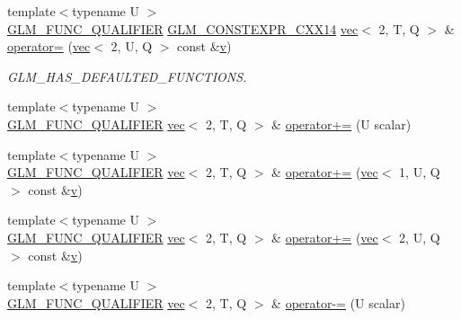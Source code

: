 \begin{DoxyCompactItemize}
\item 
{\footnotesize template$<$typename U $>$ }\\\hyperlink{setup_8hpp_a33fdea6f91c5f834105f7415e2a64407}{G\+L\+M\+\_\+\+F\+U\+N\+C\+\_\+\+Q\+U\+A\+L\+I\+F\+I\+ER} \hyperlink{setup_8hpp_a4dd12abf5e1164bc57f3a34671d03844}{G\+L\+M\+\_\+\+C\+O\+N\+S\+T\+E\+X\+P\+R\+\_\+\+C\+X\+X14} \hyperlink{structglm_1_1vec}{vec}$<$ 2, T, Q $>$ \& \hyperlink{structglm_1_1vec_3_012_00_01_t_00_01_q_01_4_a9bd00e17d1fda738c0e07b652e39e7f6}{operator=} (\hyperlink{structglm_1_1vec}{vec}$<$ 2, U, Q $>$ const \&\hyperlink{_s_d_l__opengl_8h_a10a82eabcb59d2fcd74acee063775f90}{v})
\begin{DoxyCompactList}\small\item\em G\+L\+M\+\_\+\+H\+A\+S\+\_\+\+D\+E\+F\+A\+U\+L\+T\+E\+D\+\_\+\+F\+U\+N\+C\+T\+I\+O\+NS. \end{DoxyCompactList}\item 
{\footnotesize template$<$typename U $>$ }\\\hyperlink{setup_8hpp_a33fdea6f91c5f834105f7415e2a64407}{G\+L\+M\+\_\+\+F\+U\+N\+C\+\_\+\+Q\+U\+A\+L\+I\+F\+I\+ER} \hyperlink{structglm_1_1vec}{vec}$<$ 2, T, Q $>$ \& \hyperlink{structglm_1_1vec_3_012_00_01_t_00_01_q_01_4_a85009f198924c17e5830290e55c04323}{operator+=} (U scalar)
\item 
{\footnotesize template$<$typename U $>$ }\\\hyperlink{setup_8hpp_a33fdea6f91c5f834105f7415e2a64407}{G\+L\+M\+\_\+\+F\+U\+N\+C\+\_\+\+Q\+U\+A\+L\+I\+F\+I\+ER} \hyperlink{structglm_1_1vec}{vec}$<$ 2, T, Q $>$ \& \hyperlink{structglm_1_1vec_3_012_00_01_t_00_01_q_01_4_a5a24f12fc3b14e67842a4759cdca08b2}{operator+=} (\hyperlink{structglm_1_1vec}{vec}$<$ 1, U, Q $>$ const \&\hyperlink{_s_d_l__opengl_8h_a10a82eabcb59d2fcd74acee063775f90}{v})
\item 
{\footnotesize template$<$typename U $>$ }\\\hyperlink{setup_8hpp_a33fdea6f91c5f834105f7415e2a64407}{G\+L\+M\+\_\+\+F\+U\+N\+C\+\_\+\+Q\+U\+A\+L\+I\+F\+I\+ER} \hyperlink{structglm_1_1vec}{vec}$<$ 2, T, Q $>$ \& \hyperlink{structglm_1_1vec_3_012_00_01_t_00_01_q_01_4_aeddb35c29290a573a8e33b70c2bb5cd8}{operator+=} (\hyperlink{structglm_1_1vec}{vec}$<$ 2, U, Q $>$ const \&\hyperlink{_s_d_l__opengl_8h_a10a82eabcb59d2fcd74acee063775f90}{v})
\item 
{\footnotesize template$<$typename U $>$ }\\\hyperlink{setup_8hpp_a33fdea6f91c5f834105f7415e2a64407}{G\+L\+M\+\_\+\+F\+U\+N\+C\+\_\+\+Q\+U\+A\+L\+I\+F\+I\+ER} \hyperlink{structglm_1_1vec}{vec}$<$ 2, T, Q $>$ \& \hyperlink{structglm_1_1vec_3_012_00_01_t_00_01_q_01_4_a55b50722876c56ed99f91322a5f9a5b4}{operator-\/=} (U scalar)

\end{DoxyCompactItemize}
